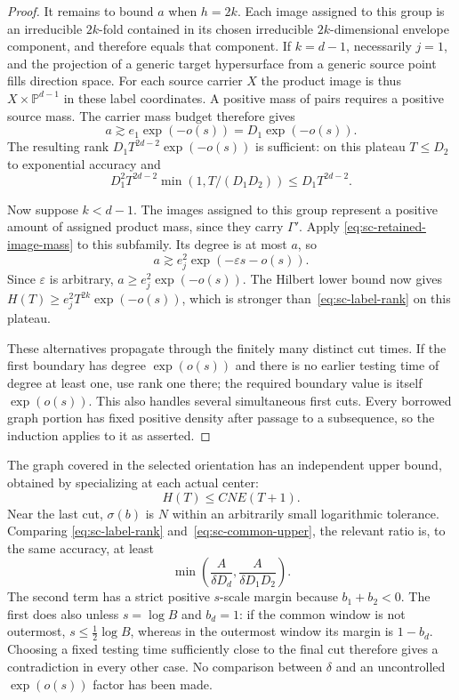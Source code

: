 \begin{proof}
It remains to bound $a$ when $h=2k$.  Each image assigned to this group is an irreducible $2k$-fold contained in its chosen irreducible $2k$-dimensional envelope component, and therefore equals that component. If $k=d-1$, necessarily $j=1$, and the projection of a generic target hypersurface from a generic source point fills direction space.  For each source carrier $X$ the product image is thus $X\times\mathbb{P}^{d-1}$ in these label coordinates.  A positive mass of pairs requires a positive source mass.  The carrier mass budget therefore gives
\[
 a\gtrsim e_1\exp(-o(s))=D_1\exp(-o(s)).
\]
The resulting rank $D_1T^{2d-2}\exp(-o(s))$ is sufficient: on this plateau $T\le D_2$ to exponential accuracy and
\[
 D_1^2T^{2d-2}\min(1,T/(D_1D_2))
 \le D_1T^{2d-2}.
\]

Now suppose $k<d-1$.  The images assigned to this group represent a positive amount of assigned product mass, since they carry $\Gamma'$.  Apply \eqref{eq:sc-retained-image-mass} to this subfamily. Its degree is at most $a$, so
\[
 a\gtrsim e_j^2\exp(-\varepsilon s-o(s)).
\]
Since $\varepsilon$ is arbitrary, $a\ge e_j^2\exp(-o(s))$. The Hilbert lower bound now gives $H(T)\ge e_j^2T^{2k}\exp(-o(s))$, which is stronger than~\eqref{eq:sc-label-rank} on this plateau.

These alternatives propagate through the finitely many distinct cut times.  If the first boundary has degree $\exp(o(s))$ and there is no earlier testing time of degree at least one, use rank one there; the required boundary value is itself $\exp(o(s))$.  This also handles several simultaneous first cuts.  Every borrowed graph portion has fixed positive density after passage to a subsequence, so the induction applies to it as asserted.
\end{proof}

The graph covered in the selected orientation has an independent upper bound, obtained by specializing at each actual center:
\begin{equation}\label{eq:sc-common-upper}
 H(T)\le CNE(T+1).
\end{equation}
Near the last cut, $\sigma(b)$ is $N$ within an arbitrarily small logarithmic tolerance.  Comparing \eqref{eq:sc-label-rank} and~\eqref{eq:sc-common-upper}, the relevant ratio is, to the same accuracy, at least
\begin{equation}\label{eq:sc-common-ratio}
 \min\left(\frac{A}{\delta D_d},
            \frac{A}{\delta D_1D_2}\right).
\end{equation}
The second term has a strict positive $s$-scale margin because $b_1+b_2<0$.  The first does also unless $s=\log B$ and $b_d=1$: if the common window is not outermost, $s\le\tfrac12\log B$, whereas in the outermost window its margin is $1-b_d$. Choosing a fixed testing time sufficiently close to the final cut therefore gives a contradiction in every other case. No comparison between $\delta$ and an uncontrolled $\exp(o(s))$ factor has been made.


